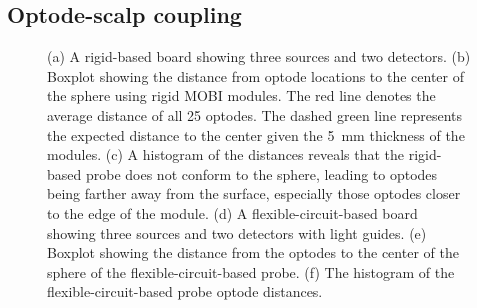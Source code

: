 \subsection{Optode-scalp coupling}
\begin{figure}
	\begin{center}
	\end{center}
	\caption{(a) A rigid-based board showing three sources and two detectors. (b) Boxplot showing the distance from optode locations to the center of the sphere using rigid MOBI modules. The red line denotes the average distance of all 25 optodes. The dashed green line represents the expected distance to the center given the 5~mm thickness of the modules. (c) A histogram of the distances reveals that the rigid-based probe does not conform to the sphere, leading to optodes being farther away from the surface, especially those optodes closer to the edge of the module. (d) A flexible-circuit-based board showing three sources and two detectors with light guides. (e) Boxplot showing the distance from the optodes to the center of the sphere of the flexible-circuit-based probe. (f) The histogram of the flexible-circuit-based probe optode distances.} 
	\label{fig:coupling}
\end{figure} 
